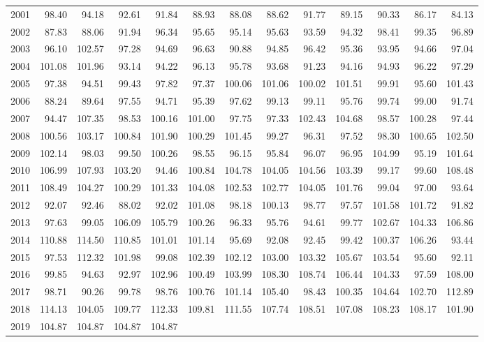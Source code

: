 \begin{longtable}{rrrrrrrrrrrrr}
  2001 & 98.40 & 94.18 & 92.61 & 91.84 & 88.93 & 88.08 & 88.62 & 91.77 & 89.15 & 90.33 & 86.17 & 84.13 \\ 
  2002 & 87.83 & 88.06 & 91.94 & 96.34 & 95.65 & 95.14 & 95.63 & 93.59 & 94.32 & 98.41 & 99.35 & 96.89 \\ 
  2003 & 96.10 & 102.57 & 97.28 & 94.69 & 96.63 & 90.88 & 94.85 & 96.42 & 95.36 & 93.95 & 94.66 & 97.04 \\ 
  2004 & 101.08 & 101.96 & 93.14 & 94.22 & 96.13 & 95.78 & 93.68 & 91.23 & 94.16 & 94.93 & 96.22 & 97.29 \\ 
  2005 & 97.38 & 94.51 & 99.43 & 97.82 & 97.37 & 100.06 & 101.06 & 100.02 & 101.51 & 99.91 & 95.60 & 101.43 \\ 
  2006 & 88.24 & 89.64 & 97.55 & 94.71 & 95.39 & 97.62 & 99.13 & 99.11 & 95.76 & 99.74 & 99.00 & 91.74 \\ 
  2007 & 94.47 & 107.35 & 98.53 & 100.16 & 101.00 & 97.75 & 97.33 & 102.43 & 104.68 & 98.57 & 100.28 & 97.44 \\ 
  2008 & 100.56 & 103.17 & 100.84 & 101.90 & 100.29 & 101.45 & 99.27 & 96.31 & 97.52 & 98.30 & 100.65 & 102.50 \\ 
  2009 & 102.14 & 98.03 & 99.50 & 100.26 & 98.55 & 96.15 & 95.84 & 96.07 & 96.95 & 104.99 & 95.19 & 101.64 \\ 
  2010 & 106.99 & 107.93 & 103.20 & 94.46 & 100.84 & 104.78 & 104.05 & 104.56 & 103.39 & 99.17 & 99.60 & 108.48 \\ 
  2011 & 108.49 & 104.27 & 100.29 & 101.33 & 104.08 & 102.53 & 102.77 & 104.05 & 101.76 & 99.04 & 97.00 & 93.64 \\ 
  2012 & 92.07 & 92.46 & 88.02 & 92.02 & 101.08 & 98.18 & 100.13 & 98.77 & 97.57 & 101.58 & 101.72 & 91.82 \\ 
  2013 & 97.63 & 99.05 & 106.09 & 105.79 & 100.26 & 96.33 & 95.76 & 94.61 & 99.77 & 102.67 & 104.33 & 106.86 \\ 
  2014 & 110.88 & 114.50 & 110.85 & 101.01 & 101.14 & 95.69 & 92.08 & 92.45 & 99.42 & 100.37 & 106.26 & 93.44 \\ 
  2015 & 97.53 & 112.32 & 101.98 & 99.08 & 102.39 & 102.12 & 103.00 & 103.32 & 105.67 & 103.54 & 95.60 & 92.11 \\ 
  2016 & 99.85 & 94.63 & 92.97 & 102.96 & 100.49 & 103.99 & 108.30 & 108.74 & 106.44 & 104.33 & 97.59 & 108.00 \\ 
  2017 & 98.71 & 90.26 & 99.78 & 98.76 & 100.76 & 101.14 & 105.40 & 98.43 & 100.35 & 104.64 & 102.70 & 112.89 \\ 
  2018 & 114.13 & 104.05 & 109.77 & 112.33 & 109.81 & 111.55 & 107.74 & 108.51 & 107.08 & 108.23 & 108.17 & 101.90 \\ 
  2019 & 104.87 & 104.87 & 104.87 & 104.87 &  &  &  &  &  &  &  &  \\ 
   \hline
\hline
\end{longtable}
